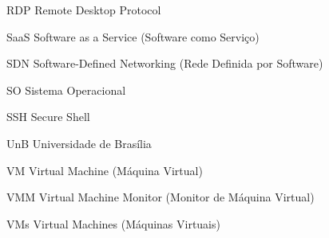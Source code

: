 \begin{siglas}
  \item[RDP] Remote Desktop Protocol
  \item[SaaS] Software as a Service (Software como Serviço)
  \item[SDN] Software-Defined Networking (Rede Definida por Software)
  \item[SO] Sistema Operacional
  \item[SSH] Secure Shell
  \item[UnB] Universidade de Brasília
  \item[VM] Virtual Machine (Máquina Virtual)
  \item[VMM] Virtual Machine Monitor (Monitor de Máquina Virtual)
  \item[VMs] Virtual Machines (Máquinas Virtuais)
\end{siglas}
